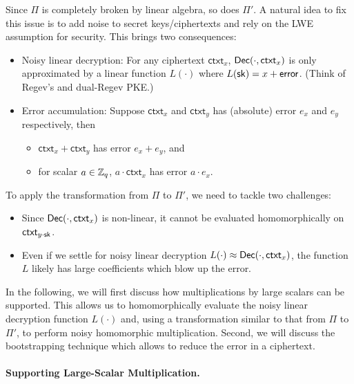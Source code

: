 \documentclass[10pt,twoside]{article}
\newcommand{\ctxt}{\mathsf{ctxt}}
\begin{document}
Since $\Pi$ is completely broken by linear algebra, so does $\Pi'$.
A natural idea to fix this issue is to add noise to secret keys/ciphertexts and rely on the LWE assumption for security.
This brings two consequences:
\begin{itemize}
    \item Noisy linear decryption: 
    For any ciphertext $\ctxt_x$, $\dec(\cdot,\ctxt_x)$ is only approximated by a linear function $L(\cdot)$ where $L(\sk) = x + \mathsf{error}$. (Think of Regev's and dual-Regev PKE.)
    \item Error accumulation: Suppose $\ctxt_x$ and $\ctxt_y$ has (absolute) error $e_x$ and $e_y$ respectively, then
    \begin{itemize}
        \item $\ctxt_x + \ctxt_y$ has error $e_x + e_y$, and
        \item for scalar $a \in \mathbb{Z}_q$, $a \cdot \ctxt_x$ has error $a \cdot e_x$.
    \end{itemize}
\end{itemize}
To apply the transformation from $\Pi$ to $\Pi'$, we need to tackle two challenges:
\begin{itemize}
    \item Since $\dec(\cdot,\ctxt_x)$ is non-linear, it cannot be evaluated homomorphically on $\ctxt_{y \cdot \sk}$.
    \item Even if we settle for noisy linear decryption $L(\cdot) \approx \dec(\cdot,\ctxt_x)$, the function $L$ likely has large coefficients which blow up the error.
\end{itemize}

In the following, we will first discuss how multiplications by large scalars can be supported. This allows us to homomorphically evaluate the noisy linear decryption function $L(\cdot)$ and, using a transformation similar to that from $\Pi$ to $\Pi'$, to perform noisy homomorphic multiplication. Second, we will discuss the bootstrapping technique which allows to reduce the error in a ciphertext.


\paragraph{Supporting Large-Scalar Multiplication.}
\end{document}
